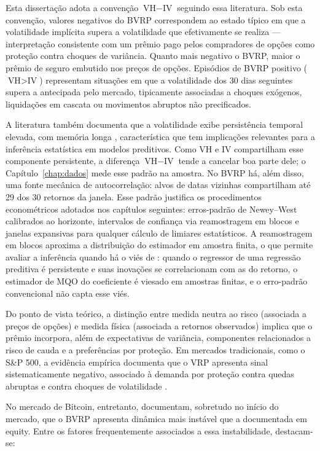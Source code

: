 Esta dissertação adota a convenção $\text{VH} - \text{IV}$ seguindo essa literatura. Sob esta convenção, valores negativos do BVRP correspondem ao estado típico em que a volatilidade implícita supera a volatilidade que efetivamente se realiza --- interpretação consistente com um prêmio pago pelos compradores de opções como proteção contra choques de variância. Quanto mais negativo o BVRP, maior o prêmio de seguro embutido nos preços de opções. Episódios de BVRP positivo ($\text{VH} > \text{IV}$) representam situações em que a volatilidade dos 30 dias seguintes supera a antecipada pelo mercado, tipicamente associadas a choques exógenos, liquidações em cascata ou movimentos abruptos não precificados.

A literatura também documenta que a volatilidade exibe persistência temporal elevada, com memória longa \citep{corsi2009har}, característica que tem implicações relevantes para a inferência estatística em modelos preditivos. Como VH e IV compartilham esse componente persistente, a diferença $\text{VH} - \text{IV}$ tende a cancelar boa parte dele; o Capítulo~\ref{chap:dados} mede esse padrão na amostra. No BVRP há, além disso, uma fonte mecânica de autocorrelação: alvos de datas vizinhas compartilham até 29 dos 30 retornos da janela. Esse padrão justifica os procedimentos econométricos adotados nos capítulos seguintes: erros-padrão de Newey--West calibrados ao horizonte, intervalos de confiança via reamostragem em blocos e janelas expansivas para qualquer cálculo de limiares estatísticos. A reamostragem em blocos aproxima a distribuição do estimador em amostra finita, o que permite avaliar a inferência quando há o viés de \citet{stambaugh1999}: quando o regressor de uma regressão preditiva é persistente e suas inovações se correlacionam com as do retorno, o estimador de MQO do coeficiente é viesado em amostras finitas, e o erro-padrão convencional não capta esse viés.

Do ponto de vista teórico, a distinção entre medida neutra ao risco (associada a
preços de opções) e medida física (associada a retornos observados) implica que
o prêmio incorpora, além de expectativas de variância,
componentes relacionados a risco de cauda e a preferências por proteção. Em
mercados tradicionais, como o S\&P 500, a evidência empírica documenta que o VRP
apresenta sinal sistematicamente negativo, associado à demanda por proteção contra
quedas abruptas e contra choques de volatilidade
\citep{bollerslev2011VRP, pan2006jumpRisk, bali2009volatilitypremium}.

No mercado de Bitcoin, entretanto, \citet{alexanderImeraj2019} documentam,
sobretudo no início do mercado, que o BVRP apresenta dinâmica mais instável que a documentada em equity. Entre os
fatores frequentemente associados a essa instabilidade, destacam-se:

